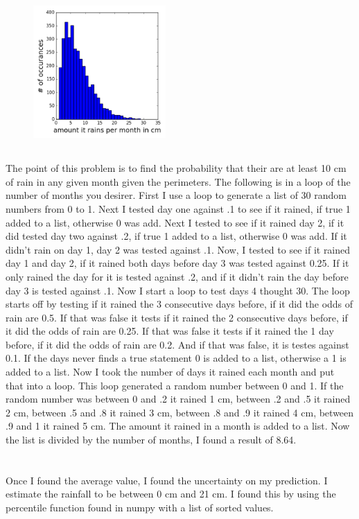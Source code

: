 \documentclass[twocolumn]{revtex4}
\begin{document}
\subsection{}
\FloatBarrier
\begin{figure}[h]
\center
    \includegraphics[width=0.45\textwidth]{figure.png}
\end{figure}
\FloatBarrier
\subsection{}
The point of this problem is to find the probability that their are at least 10 cm of rain in any given month given the perimeters. The following is in a loop of the number of months you desirer. First I use a loop to generate a list of 30 random numbers from 0 to 1. Next I tested day one against .1 to see if it rained, if true 1 added to a list, otherwise 0 was add. Next I tested to see if it rained day 2, if it did tested day two against .2,  if true 1 added to a list, otherwise 0 was add. If it didn't rain on day 1, day 2 was tested against .1. Now, I tested to see if it rained day 1 and day 2, if it rained both days before day 3 was tested against 0.25. If it only rained the day for it is tested against .2, and if it didn't rain the day before day 3 is tested against .1. Now I start a loop to test days 4 thought 30. The loop starts off by testing if it rained the 3 consecutive days before, if it did the odds of rain are 0.5. If that was false it tests if it rained the 2 consecutive days before, if it did the odds of rain are 0.25. If that was false it tests if it rained the 1 day before, if it did the odds of rain are 0.2. And if that was false, it is testes against 0.1. If the days never finds a true statement 0 is added to a list, otherwise a 1 is added to a list. Now I took the number of days it rained each month and put that into a loop. This loop generated a random number between 0 and 1. If the random number was between 0 and .2 it rained 1 cm, between .2 and .5 it rained 2 cm, between .5 and .8 it rained 3 cm, between .8 and .9 it rained 4 cm, between .9 and 1 it rained 5 cm. The amount it rained in a  month is added to a list. Now the list is divided by the number of months, I found a result of 8.64. 
\section{}
Once I found the average value, I found the uncertainty on my prediction. I estimate the rainfall to be between 0 cm and 21 cm. I found this by using the percentile function found in numpy with a list of sorted values.

\end{document}
